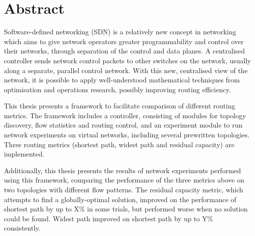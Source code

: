\chapter{Abstract}

Software-defined networking (SDN) is a relatively new concept in networking which aims to give network operators greater programmability and control over their networks, through separation of the control and data planes. A centralised controller sends network control packets to other switches on the network, usually along a separate, parallel control network. With this new, centralised view of the network, it is possible to apply well-understood mathematical techniques from optimisation and operations research, possibly improving routing efficiency.

This thesis presents a framework to facilitate comparison of different routing metrics. The framework includes a controller, consisting of modules for topology discovery, flow statistics and routing control, and an experiment module to run network experiments on virtual networks, including several prewritten topologies. Three routing metrics (shortest path, widest path and residual capacity) are implemented.

Additionally, this thesis presents the results of network experiments performed using this framework, comparing the performance of the three metrics above on two topologies with different flow patterns. The residual capacity metric, which attempts to find a globally-optimal solution, improved on the performance of shortest path by up to X\% in some trials, but performed worse when no solution could be found. Widest path improved on shortest path by up to Y\% consistently.
